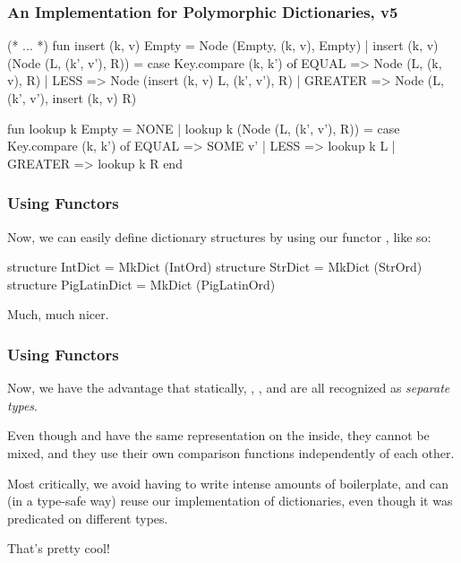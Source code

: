 \documentclass[aspectratio=169, handout]{beamer}
\begin{document}
\begin{frame}[fragile]
  \frametitle{An Implementation for Polymorphic Dictionaries, v5}

  {\small
  \begin{codeblock}
    (* ... *)
      fun insert (k, v) Empty = Node (Empty, (k, v), Empty)
        | insert (k, v) (Node (L, (k', v'), R)) =
            case Key.compare (k, k') of
              EQUAL   => Node (L, (k, v), R)
            | LESS    => Node (insert (k, v) L, (k', v'), R)
            | GREATER => Node (L, (k', v'), insert (k, v) R)

      fun lookup k Empty = NONE
        | lookup k (Node (L, (k', v'), R)) =
            case Key.compare (k, k') of
              EQUAL   => SOME v'
            | LESS    => lookup k L
            | GREATER => lookup k R
    end
  \end{codeblock}
  }

\end{frame}

\begin{frame}[fragile]
  \frametitle{Using Functors}

  Now, we can easily define dictionary structures by using our functor
  , like so:
  \pause

  \begin{codeblock}
    structure IntDict      = MkDict (IntOrd)
    structure StrDict      = MkDict (StrOrd)
    structure PigLatinDict = MkDict (PigLatinOrd)
  \end{codeblock}

  \pause
  \vspace{\fill}

  Much, much nicer.
\end{frame}

\begin{frame}[fragile]
  \frametitle{Using Functors}

  Now, we have the advantage that statically, ,
  , and  are all recognized as
  \textit{separate types}.

  \pause
  \vspace{\fill}

  Even though  and  have the same
  representation on the inside, they cannot be mixed, and they use
  their own comparison functions independently of each other.

  \pause
  \vspace{\fill}

  Most critically, we avoid having to write intense amounts of boilerplate,
  and can (in a type-safe way) reuse our implementation of dictionaries,
  even though it was predicated on different types.

  \vspace{\fill}

  That's pretty cool!


\end{frame}
\end{document}
